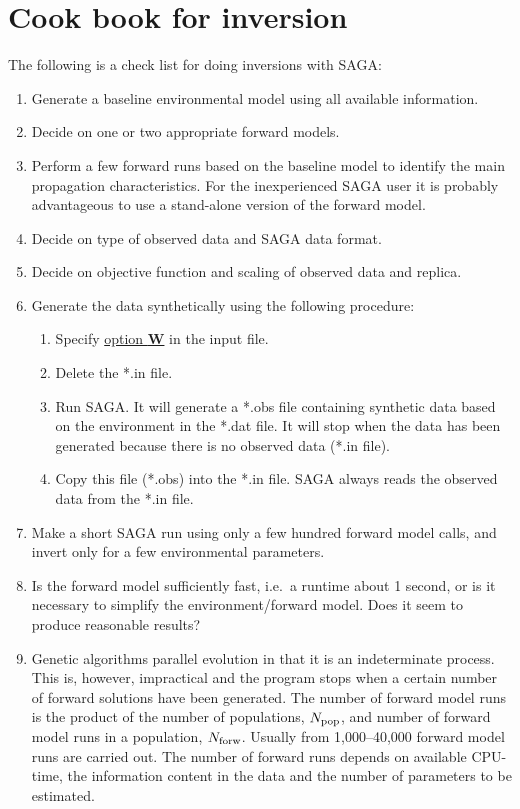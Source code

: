 \documentclass{saclantc}
\begin{document}
\section{Cook book for inversion}
\label{se:cook}

The following is a check list for doing 
inversions with {\sf SAGA}:

\begin{enumerate}
\item Generate a baseline
environmental model using all available information.
\item Decide on one or two appropriate forward models.
\item Perform a few forward runs based on the  baseline model to 
identify the main propagation characteristics. For the
inexperienced {\sf SAGA} user it is probably advantageous to use a
stand-alone version of the forward model.
\item Decide on type of observed data and {\sf SAGA} data format.
\item Decide on objective function and scaling of observed data and replica.
\item Generate the data synthetically using the following procedure:
\begin{enumerate}
  \item Specify \underline{option {\bf W}} in the input file.
  \item Delete the *.in file.
  \item Run {\sf SAGA}. It will generate a *.obs file containing
	synthetic data based on the
	environment in the *.dat file. It will stop when the data has been
	generated because there is no observed data (*.in file).
  \item Copy this file (*.obs) into the *.in file. {\sf SAGA}
	always reads the observed data from the *.in file. 
\end{enumerate}
\item Make a short {\sf SAGA} run using only a few hundred forward
model calls, and
invert only for a few environmental parameters.
\item Is the forward model sufficiently fast, i.e.\ a runtime about 1
second, or is it necessary to simplify the environment/forward
model. Does it seem to produce reasonable results?
\item Genetic algorithms parallel  evolution in that it is
an indeterminate process. This is, however, impractical and the program
stops when a certain number of forward solutions have been generated. 
The number of forward model runs is the product of the number of
populations, $N_{\rm pop}$, and number of forward model runs in a population,
$N_{\rm forw}$.
Usually from 1,000--40,000 forward model runs are carried out. The
number of
forward runs depends on available CPU-time, the
information content in the data and the number of parameters to be estimated.


\end{enumerate}
\end{document}
